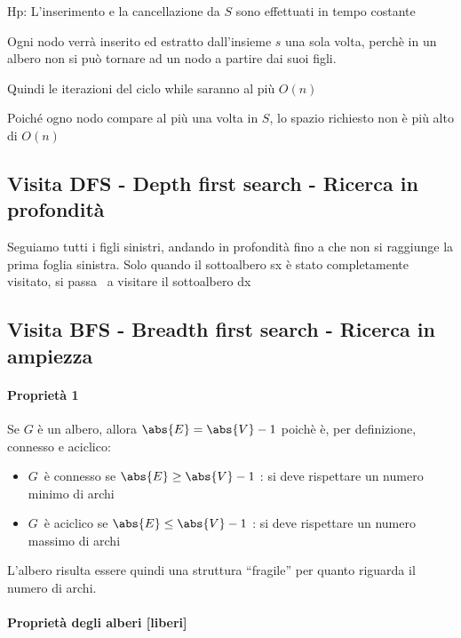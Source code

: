{{Hp: L'inserimento e la cancellazione da $S$ sono effettuati in tempo costante}

{Ogni nodo verrà inserito ed estratto dall'insieme $s$ una sola volta, perchè in un albero non si può tornare ad un nodo a partire dai suoi figli.}

{Quindi le iterazioni del ciclo while saranno al più $O(n)$}

{Poiché ogno nodo compare al più una volta in $S$, lo spazio richiesto non è più alto di $O(n)$}

\subsection{Visita DFS - Depth first search - Ricerca in profondità}

{Seguiamo tutti i figli sinistri, andando in profondità fino a che non si raggiunge la prima foglia sinistra. Solo quando il sottoalbero sx è stato completamente visitato, si passa ~a visitare il sottoalbero dx}



\subsection{Visita BFS - Breadth first search - Ricerca in ampiezza}

\paragraph{Proprietà 1}

Se $G$ è un albero, allora $\abs{E} = \abs{V} - 1$ poichè è, per definizione, connesso e aciclico:

\begin{itemize}
\tightlist
\item
  $G${~è connesso se $\abs{E} \geq \abs{V} - 1$ : si deve rispettare un numero minimo di archi}
\item
  $G${~è aciclico se $\abs{E} \leq \abs{V} - 1$ : si deve rispettare un numero massimo di archi}
\end{itemize}

{L'albero risulta essere quindi una struttura ``fragile'' per quanto riguarda il numero di archi.}

\paragraph{Proprietà degli alberi {[}liberi{]}}

}
